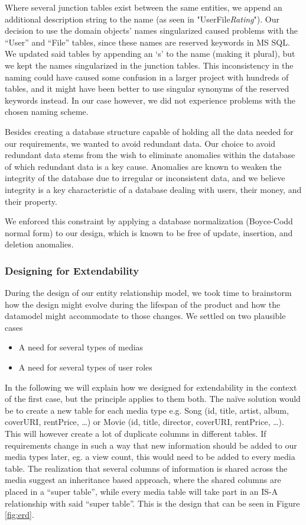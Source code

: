 Where several junction tables exist between the same entities, we append an
additional description string to the name (as seen in
"UserFile\textit{Rating}"). Our decision to use the domain objects' names
singularized caused problems with the “User” and “File” tables, since these
names are reserved keywords in MS SQL. We updated said tables by appending an
‘s’ to the name (making it plural), but we kept the names singularized in the
junction tables. This inconsistency in the naming could have caused some
confusion in a larger project with hundreds of tables, and it might have been
better to use singular synonyms of the reserved keywords instead. In our case
however, we did not experience problems with the chosen naming scheme.

Besides creating a database structure capable of holding all the data needed
for our requirements, we wanted to avoid redundant data. Our choice to avoid
redundant data stems from the wish to eliminate anomalies within the database
of which redundant data is a key cause. Anomalies are known to weaken the
integrity of the database\cite{dbbook} due to irregular or inconsistent data,
and we believe integrity is a key characteristic of a database dealing with
users, their money, and their property.

We enforced this constraint by applying a database normalization (Boyce-Codd
normal form) to our design, which is known to be free of update, insertion, and
deletion anomalies.

\subsubsection{Designing for Extendability}
\label{sec:extendability}
During the design of our entity relationship model, we took time to brainstorm how the design might evolve during the lifespan of the product and how the datamodel might accommodate to those changes. We settled on two plausible cases
\begin{itemize}
\item A need for several types of medias
\item A need for several types of user roles
\end{itemize}

In the following we will explain how we designed for extendability in the
context of the first case, but the principle applies to them both. The naïve
solution would be to create a new table for each media type e.g. Song (id,
title, artist, album, coverURI, rentPrice, …) or Movie (id, title, director,
coverURI, rentPrice, …). This will however create a lot of duplicate columns in
different tables. If requirements change in such a way that new information
should be added to our media types later, eg. a view count, this would need to
be added to every media table. The realization that several columns of
information is shared across the media suggest an inheritance based approach,
where the shared columns are placed in a “super table”, while every media table
will take part in an IS-A relationship with said “super table”. This is the
design that can be seen in Figure \ref{fig:erd}.

